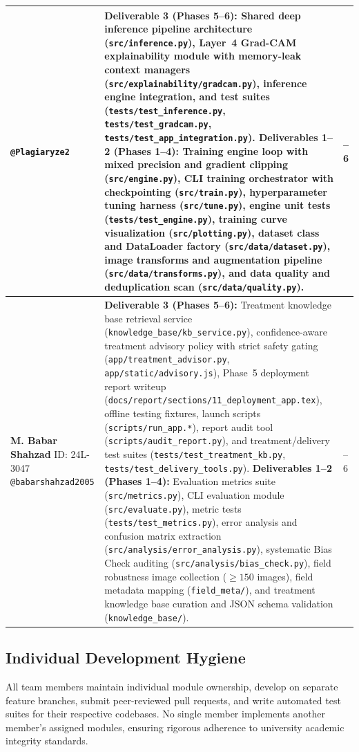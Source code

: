 \begin{table}[!ht]
\begin{tabular}{@{}p{3.5cm}p{10.2cm}>{\centering\arraybackslash}p{1.2cm}@{}}
\texttt{@Plagiaryze2} & 
\textbf{Deliverable 3 (Phases 5--6):} Shared deep inference pipeline architecture (\texttt{src/inference.py}), Layer~4 Grad-CAM explainability module with memory-leak context managers (\texttt{src/explainability/gradcam.py}), inference engine integration, and test suites (\texttt{tests/test\_inference.py}, \texttt{tests/test\_gradcam.py}, \texttt{tests/test\_app\_integration.py}). \newline
\textbf{Deliverables 1--2 (Phases 1--4):} Training engine loop with mixed precision and gradient clipping (\texttt{src/engine.py}), CLI training orchestrator with checkpointing (\texttt{src/train.py}), hyperparameter tuning harness (\texttt{src/tune.py}), engine unit tests (\texttt{tests/test\_engine.py}), training curve visualization (\texttt{src/plotting.py}), dataset class and DataLoader factory (\texttt{src/data/dataset.py}), image transforms and augmentation pipeline (\texttt{src/data/transforms.py}), and data quality and deduplication scan (\texttt{src/data/quality.py}). & 1--6 \\
\midrule
\textbf{M. Babar Shahzad}\newline
ID: 24L-3047\newline
\texttt{@babarshahzad2005} & 
\textbf{Deliverable 3 (Phases 5--6):} Treatment knowledge base retrieval service (\texttt{knowledge\_base/kb\_service.py}), confidence-aware treatment advisory policy with strict safety gating (\texttt{app/treatment_advisor.py}, \texttt{app/static/advisory.js}), Phase~5 deployment report writeup (\texttt{docs/report/sections/11\_deployment\_app.tex}), offline testing fixtures, launch scripts (\texttt{scripts/run\_app.*}), report audit tool (\texttt{scripts/audit\_report.py}), and treatment/delivery test suites (\texttt{tests/test\_treatment\_kb.py}, \texttt{tests/test\_delivery\_tools.py}). \newline
\textbf{Deliverables 1--2 (Phases 1--4):} Evaluation metrics suite (\texttt{src/metrics.py}), CLI evaluation module (\texttt{src/evaluate.py}), metric tests (\texttt{tests/test\_metrics.py}), error analysis and confusion matrix extraction (\texttt{src/analysis/error\_analysis.py}), systematic Bias Check auditing (\texttt{src/analysis/bias\_check.py}), field robustness image collection ($\ge 150$ images), field metadata mapping (\texttt{field\_meta/}), and treatment knowledge base curation and JSON schema validation (\texttt{knowledge\_base/}). & 1--6 \\
\bottomrule
\end{tabular}
\end{table}

\subsection{Individual Development Hygiene}
All team members maintain individual module ownership, develop on separate feature branches, submit peer-reviewed pull requests, and write automated test suites for their respective codebases. No single member implements another member's assigned modules, ensuring rigorous adherence to university academic integrity standards.

\clearpage

